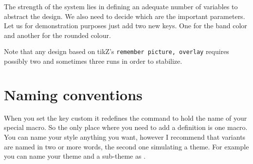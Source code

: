 
The strength of the system lies in defining an adequate number of variables to abstract the design. We also need to decide which are the important parameters. Let us for demonstration purposes just add two new keys.
One for the band color and another for the rounded colour.

\begin{tcblisting}{}
\end{tcblisting}

Note that any design based on tikZ's  \texttt{remember picture, overlay} requires possibly two and sometimes three runs in order to stabilize.



\newcommand{\tikzspecials}[2][]{%
\begin{tikzpicture}[remember picture,overlay]
    \node[yshift=\yshift@cx] at (current page.north west)
      {\begin{tikzpicture}[remember picture, overlay]
        \draw[fill=\fill@cx, draw=none] (0,0) rectangle (\paperwidth,3cm);
        \node[anchor=east,xshift=.9\paperwidth,rectangle,
              rounded corners=10pt,inner sep=11pt,
              fill=\fill@cx]{%
        \titlefontcolor@cx
        \titlefontsize@cx\bfseries
        \titlefontfamily@cx
        \thechapter\
        \textsc{#2}};
      \draw [fill=red] (0,10cm) -- (5cm,10cm);
       \end{tikzpicture}
      };
\end{tikzpicture}
\mbox{}
\vspace*{60pt}\par
}




\section{Naming conventions}

When you set the key custom it redefines the command  to hold the name of your special macro.  So the only place where you need to add a definition is one macro. You can name your style anything you want, however I recommend that variants are named in two or more words, the second one simulating a theme. For example you can name your theme  and a sub-theme as  .


